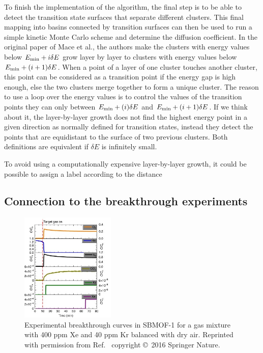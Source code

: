 \documentclass[main]{subfiles}
\begin{document}
To finish the implementation of the algorithm, the final step is to be able to detect the transition state surfaces that separate different clusters. This final mapping into basins connected by transition surfaces can then be used to run a simple kinetic Monte Carlo scheme and determine the diffusion coefficient. In the original paper of Mace et al.\autocite{Mace_2019}, the authors make the clusters with energy values below $E_{\text{min}}+i\delta E$ grow layer by layer to clusters with energy values below $E_{\text{min}}+(i+1)\delta E$. When a point of a layer of one cluster touches another cluster, this point can be considered as a transition point if the energy gap is high enough, else the two clusters merge together to form a unique cluster. The reason to use a loop over the energy values is to control the values of the transition points they can only between $E_{\text{min}}+(i)\delta E$ and $E_{\text{min}}+(i+1)\delta E$. If we think about it, the layer-by-layer growth does not find the highest energy point in a given direction as normally defined for transition states, instead they detect the points that are equidistant to the surface of two previous clusters. Both definitions are equivalent if $\delta E$ is infinitely small.

To avoid using a computationally expensive layer-by-layer growth, it could be possible to assign a label according to the distance 


\subsection{Connection to the breakthrough experiments}

\begin{figure}[ht]
  \centering
  \includegraphics[width=0.4\textwidth]{figures/6-perspectives/sbmof_breakthrough.jpg}
  \caption{ Experimental breakthrough curves in SBMOF-1 for a gas mixture with 400 ppm Xe and 40 ppm Kr balanced with dry air. Reprinted with permission from Ref.~\cite{Banerjee_2016} copyright \copyright\ 2016 Springer Nature. }\label{fgr:sbmof_breakthrough}
\end{figure}
\end{document}
